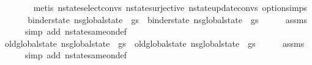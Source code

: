\begin{isabellebody}
\ \ \ \ \ \ \isamarkupfalse%
\ {\isacharparenleft}{\kern0pt}metis\ nstate{\isachardot}{\kern0pt}select{\isacharunderscore}{\kern0pt}convs{\isacharparenleft}{\kern0pt}{}{\isacharparenright}{\kern0pt}\ nstate{\isachardot}{\kern0pt}surjective\ nstate{\isachardot}{\kern0pt}update{\isacharunderscore}{\kern0pt}convs{\isacharparenleft}{\kern0pt}{}{\isacharparenright}{\kern0pt}\ option{\isachardot}{\kern0pt}simps{\isacharparenleft}{\kern0pt}{}{\isacharparenright}{\kern0pt}{\isacharparenright}{\kern0pt}\isanewline
\ \ \isamarkupfalse%
\isanewline
{}\isamarkupfalse%
\isanewline
\ \ \isamarkupfalse%
\ {\isachardoublequoteopen}binder{\isacharunderscore}{\kern0pt}state\ {\isacharparenleft}{\kern0pt}ns{}{\isasymlparr}global{\isacharunderscore}{\kern0pt}state\ {\isacharcolon}{\kern0pt}{\isacharequal}{\kern0pt}\ gs{\isasymrparr}{\isacharparenright}{\kern0pt}\ {\isacharequal}{\kern0pt}\ binder{\isacharunderscore}{\kern0pt}state\ {\isacharparenleft}{\kern0pt}ns{}{\isasymlparr}global{\isacharunderscore}{\kern0pt}state\ {\isacharcolon}{\kern0pt}{\isacharequal}{\kern0pt}\ gs{\isasymrparr}{\isacharparenright}{\kern0pt}{\isachardoublequoteclose}\isanewline
\ \ \ \ \isamarkupfalse%
\ assms\isanewline
\ \ \ \ \isamarkupfalse%
\ {\isacharparenleft}{\kern0pt}simp\ add{\isacharcolon}{\kern0pt}\ nstate{\isacharunderscore}{\kern0pt}same{\isacharunderscore}{\kern0pt}on{\isacharunderscore}{\kern0pt}def{\isacharparenright}{\kern0pt}\isanewline
{}\isamarkupfalse%
\isanewline
\ \ \isamarkupfalse%
\ {\isachardoublequoteopen}old{\isacharunderscore}{\kern0pt}global{\isacharunderscore}{\kern0pt}state\ {\isacharparenleft}{\kern0pt}ns{}{\isasymlparr}global{\isacharunderscore}{\kern0pt}state\ {\isacharcolon}{\kern0pt}{\isacharequal}{\kern0pt}\ gs{\isasymrparr}{\isacharparenright}{\kern0pt}\ {\isacharequal}{\kern0pt}\ old{\isacharunderscore}{\kern0pt}global{\isacharunderscore}{\kern0pt}state\ {\isacharparenleft}{\kern0pt}ns{}{\isasymlparr}global{\isacharunderscore}{\kern0pt}state\ {\isacharcolon}{\kern0pt}{\isacharequal}{\kern0pt}\ gs{\isasymrparr}{\isacharparenright}{\kern0pt}{\isachardoublequoteclose}\isanewline
\ \ \ \ \isamarkupfalse%
\ assms\isanewline
\ \ \ \ \isamarkupfalse%
\ {\isacharparenleft}{\kern0pt}simp\ add{\isacharcolon}{\kern0pt}\ nstate{\isacharunderscore}{\kern0pt}same{\isacharunderscore}{\kern0pt}on{\isacharunderscore}{\kern0pt}def{\isacharparenright}{\kern0pt}\isanewline

\end{isabellebody}
